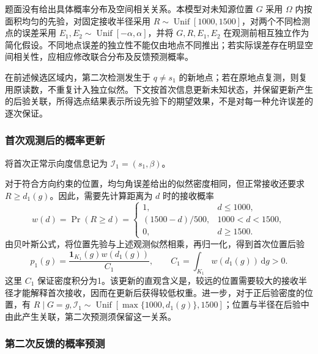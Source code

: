 \documentclass[UTF8,a4paper,zihao=-4,fontset=none]{ctexart}
\begin{document}
题面没有给出具体概率分布及空间相关关系。本模型对未知源位置 \(G\) 采用 \(\Omega\) 内按面积均匀的先验，对固定接收半径采用 \(R\sim\operatorname{Unif}[1000,1500]\)，对两个不同检测点的误差采用 \(E_1,E_2\sim\operatorname{Unif}[-\alpha,\alpha]\)，并将 \(G,R,E_1,E_2\) 在观测前相互独立作为简化假设。不同地点误差的独立性不能仅由地点不同推出；若实际误差存在明显空间相关性，应相应修改联合分布及反馈预测概率。

在前述候选区域内，第二次检测发生于 \(q\ne s_1\) 的新地点；若在原地点复测，则复用原读数，不重复计入独立似然。下文按首次信息更新未知状态，并保留更新产生的后验关联，所得选点结果表示所设先验下的期望效果，不是对每一种允许误差的逐次保证。

\subsubsection{首次观测后的概率更新}

将首次正常示向度信息记为 \(\mathcal I_1=(s_1,\beta)\)。

对于符合方向约束的位置，均匀角误差给出的似然密度相同，但正常接收还要求 \(R\ge d_1(g)\)。因此，需要先计算距离为 \(d\) 时的接收概率
\begin{equation}
 w(d)=\Pr(R\ge d)=
 \begin{cases}
 1,&d\le1000,\\
 (1500-d)/500,&1000<d<1500,\\
 0,&d\ge1500.
 \end{cases}
\label{eq:q2-pair-weight}
\end{equation}
由贝叶斯公式，将位置先验与上述观测似然相乘，再归一化，得到首次位置后验
\begin{equation}
 p_1(g)=\frac{\mathbf1_{K_1}(g)w(d_1(g))}{C_1},
 \qquad C_1=\int_{K_1}w(d_1(g))\,\mathrm dg>0.
\label{eq:q2-pair-posterior}
\end{equation}
这里 \(C_1\) 保证密度积分为1。该更新的直观含义是，较远的位置需要较大的接收半径才能解释首次接收，因而在更新后获得较低权重。进一步，对于正后验密度的位置，有 \(R\mid G=g,\mathcal I_1\sim\operatorname{Unif}[\max\{1000,d_1(g)\},1500]\)；位置与半径在后验中由此产生关联，第二次预测须保留这一关系。

\subsubsection{第二次反馈的概率预测}
\end{document}

